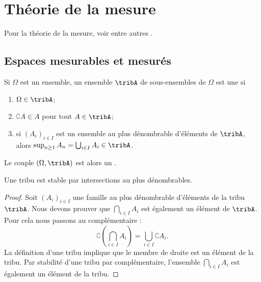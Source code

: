 
\section{Théorie de la mesure}

Pour la théorie de la mesure, voir entre autres \cite{FubiniBMauray,ProbaDanielLi}.

\subsection{Espaces mesurables et mesurés}

\begin{definition}  \label{DefjRsGSy}
    Si \( \Omega\) est un ensemble, un ensemble \( \tribA\) de sous-ensembles de \( \Omega\) est une  si 
    \begin{enumerate}
        \item
            \( \Omega\in\tribA\);
        \item
            \( \complement A\in A\) pour tout \( A\in\tribA\);
        \item
            si \( (A_i)_{i\in I}\) est un ensemble au plus dénombrable d'éléments de \( \tribA\), alors \( \sup_{n\geq 1}A_n=\bigcup_{i\in I}A_i\in\tribA\).
    \end{enumerate}
    Le couple \( (\Omega,\tribA)\) est alors un .
\end{definition}

\begin{lemma}
    Une tribu est stable par intersections au plus dénombrables.
\end{lemma}

\begin{proof}
    Soit \( (A_i)_{i\in I}\) une famille au plus dénombrable d'éléments de la tribu \( \tribA\). Nous devons prouver que \( \bigcap_{i\in I}A_i\) est également un élément de \( \tribA\). Pour cela nous passons au complémentaire :
    \begin{equation}
        \complement\left( \bigcap_{i\in I}A_i \right)=\bigcup_{i\in I}\complement A_i.
    \end{equation}
    La définition d'une tribu implique que le membre de droite est un élément de la tribu. Par stabilité d'une tribu par complémentaire, l'ensemble \( \bigcap_{i\in I}A_i\) est également un élément de la tribu.
\end{proof}

